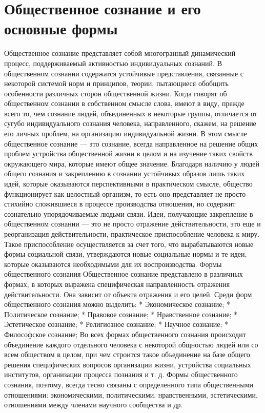 \documentclass[12pt]{article}
\begin{document}
\newpage
\section{Общественное сознание и его основные формы}
Общественное  сознание  представляет  собой  многогранный  динамический  процесс,  поддерживаемый
активностью  индивидуальных  сознаний.  В  общественном  сознании  содержатся  устойчивые  представления,
связанные с некоторой системой норм и принципов, теории, пытающиеся обобщить особенности различных
сторон общественной жизни. Когда говорят об общественном сознании в собственном смысле слова, имеют в
виду,  прежде  всего  то,  чем  сознание  людей,  объединенных  в  некоторые  группы,  отличается  от  сугубо
индивидуального сознания человека, направленного, скажем, на решение его личных проблем, на организацию
индивидуальной  жизни.  В  этом  смысле  общественное  сознание  —  это  сознание,  всегда  направленное  на
решение общих проблем устройства общественной жизни в целом и на изучение таких свойств окружающего
мира, которые имеют общее значение.
Благодаря наличию у людей общего сознания и закреплению в сознании устойчивых образов лишь таких идей,
которые  оказываются  перспективными  в  практическом  смысле,  общество  функционирует  как  целостный
организм, то есть оно представляет не просто стихийно сложившиеся в процессе производства отношения, но
содержит сознательно упорядочиваемые людьми связи.
Идеи, получающие закрепление в общественном сознании — это не просто отражение действительности, это
еще и реорганизация действительности, практическое приспособление человека к миру. Такое приспособление
осуществляется  за  счет  того,  что  вырабатываются  новые  формы  социальной  связи,  утверждаются  новые
социальные нормы и те идеи, которые оказываются необходимыми для их воспроизводства.
Формы общественного сознания
Общественное  сознание  представлено  в  различных  формах,  в  которых  выражена  специфическая
направленность отражения действительности. Она зависит от объекта отражения и его целей. Среди форм
общественного сознания можно выделить:
* Экономическое сознание;
* Политическое сознание;
* Правовое сознание;
* Нравственное сознание;
* Эстетическое сознание;
* Религиозное сознание;
* Научное сознание;
* Философское сознание;
Во всех формах общественного сознания происходит объединение каждого отдельного человека с некоторой
общностью людей  или со всем  обществом в  целом, при  чем строится такое объединение  на базе  общего
решения  специфических  вопросов  организации  жизни,  устройства  социальных  институтов,  организации
процесса познания и т. д. Формы общественного сознания, поэтому, всегда тесно связаны с определенного типа
общественными  отношениями:  экономическими,  политическими,  нравственными,  эстетическими,
отношениями между членами научного сообщества и др.
\end{document}
